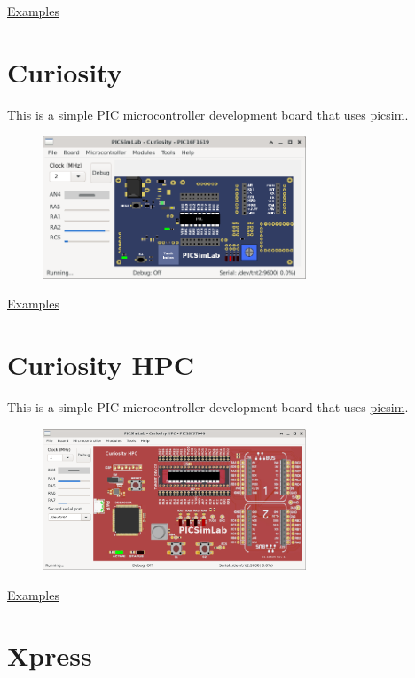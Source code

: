 \href{https://lcgamboa.github.io/picsimlab_examples/board_X.html}{Examples}

\section{Curiosity }

This is a simple PIC microcontroller development board that uses \href{https://github.com/lcgamboa/picsim}{picsim}.

\begin{figure}[H]
\center
\includegraphics[width=0.7\textwidth]{img/Curiosity.png} 
\end{figure} 

\href{https://lcgamboa.github.io/picsimlab_examples/board_Curiosity.html}{Examples}

\section{Curiosity HPC}

This is a simple PIC microcontroller development board that uses \href{https://github.com/lcgamboa/picsim}{picsim}.

\begin{figure}[H]
\center
\includegraphics[width=0.7\textwidth]{img/Curiosity_HPC.png} 
\end{figure} 

\href{https://lcgamboa.github.io/picsimlab_examples/board_Curiosity_HPC.html}{Examples}

\section{Xpress}

